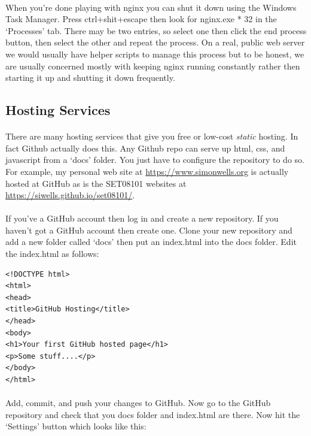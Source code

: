 \documentclass[10pt, a4paper, twosize]{article}
\begin{document}
\paragraph{} When you're done playing with nginx you can shut it down using the Windows Task Manager. Press ctrl+shit+escape then look for nginx.exe * 32 in the `Processes' tab. There may be two entries, so select one then click the end process button, then select the other and repeat the process. On a real, public web server we would usually have helper scripts to manage this process but to be honest, we are usually concerned mostly with keeping nginx running constantly rather then starting it up and shutting it down frequently.

\subsection{Hosting Services}
\paragraph{} There are many hosting services that give you free or low-cost \emph{static} hosting. In fact Github actually does this. Any Github repo can serve up html, css, and javascript from a `docs' folder. You just have to configure the repository to do so. For example, my personal web site at \url{https://www.simonwells.org} is actually hosted at GitHub as is the SET08101 websites at \url{https://siwells.github.io/set08101/}.

\paragraph{} If you've a GitHub account then log in and create a new repository. If you haven't got a GitHub account then create one. Clone your new repository and add a new folder called `docs' then put an index.html into the docs folder. Edit the index.html as follows:

\begin{lstlisting}
<!DOCTYPE html>
<html>
<head>
<title>GitHub Hosting</title>
</head>
<body>
<h1>Your first GitHub hosted page</h1>
<p>Some stuff....</p>
</body>
</html>
\end{lstlisting}

\paragraph{} Add, commit, and push your changes to GitHub. Now go to the GitHub repository and check that you docs folder and index.html are there. Now hit the `Settings' button which looks like this:
\end{document}

